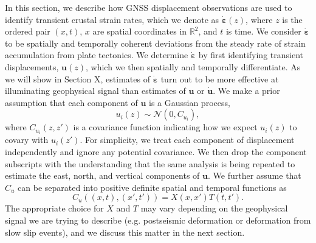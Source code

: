 \documentclass[10pt,a4paper]{article}
\begin{document}
In this section, we describe how GNSS displacement observations are used to identify transient crustal strain rates, which we denote as $\dot{\bm{\varepsilon}}(z)$, where $z$ is the ordered pair $(x,t)$, $x$ are spatial coordinates in $\mathbb{R}^2$, and $t$ is time. We consider $\dot{\bm{\varepsilon}}$ to be spatially and temporally coherent deviations from the steady rate of strain accumulation from plate tectonics. We determine $\dot{\bm{\varepsilon}}$ by first identifying transient displacements, $\bm{u}(z)$, which we then spatially and temporally differentiate.  As we will show in Section X, estimates of $\dot{\bm{\varepsilon}}$ turn out to be more effective at illuminating geophysical signal than estimates of $\bm{u}$ or $\dot{\bm{u}}$.  We make a prior assumption that each component of $\bm{u}$ is a Gaussian process,
\begin{equation}\label{eq:TransientDeformation}
u_i(z) \sim \mathcal{N}\left(0,C_{u_i}\right),
\end{equation}
where $C_{u_i}(z,z')$ is a covariance function indicating how we expect $u_i(z)$ to covary with $u_i(z')$. For simplicity, we treat each component of displacement independently and ignore any potential covariance. We then drop the component subscripts with the understanding that the same analysis is being repeated to estimate the east, north, and vertical components of $\bm{u}$. We further assume that $C_u$ can be separated into positive definite spatial and temporal functions as 
\begin{equation}\label{eq:TransientCovariance}
C_{u}\left((x,t),(x',t')\right) = X(x,x')T(t,t').
\end{equation}  
The appropriate choice for $X$ and $T$ may vary depending on the geophysical signal we are trying to describe (e.g. postseismic deformation or deformation from slow slip events), and we discuss this matter in the next section.  
\end{document}
